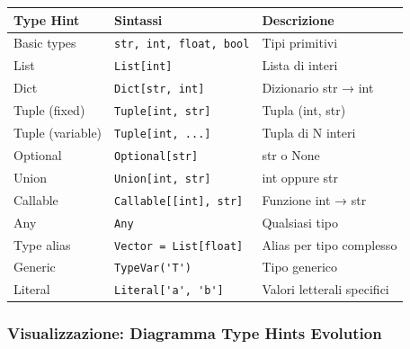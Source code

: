 \begin{center}
\begin{tabular}{|l|l|p{5cm}|}
\hline
\textbf{Type Hint} & \textbf{Sintassi} & \textbf{Descrizione} \\
\hline
Basic types & \verb|str, int, float, bool| & Tipi primitivi \\
\hline
List & \verb|List[int]| & Lista di interi \\
\hline
Dict & \verb|Dict[str, int]| & Dizionario str → int \\
\hline
Tuple (fixed) & \verb|Tuple[int, str]| & Tupla (int, str) \\
\hline
Tuple (variable) & \verb|Tuple[int, ...]| & Tupla di N interi \\
\hline
Optional & \verb|Optional[str]| & str o None \\
\hline
Union & \verb|Union[int, str]| & int oppure str \\
\hline
Callable & \verb|Callable[[int], str]| & Funzione int → str \\
\hline
Any & \verb|Any| & Qualsiasi tipo \\
\hline
Type alias & \verb|Vector = List[float]| & Alias per tipo complesso \\
\hline
Generic & \verb|TypeVar('T')| & Tipo generico \\
\hline
Literal & \verb|Literal['a', 'b']| & Valori letterali specifici \\
\hline
\end{tabular}
\end{center}

\subsubsection{Visualizzazione: Diagramma Type Hints Evolution}

